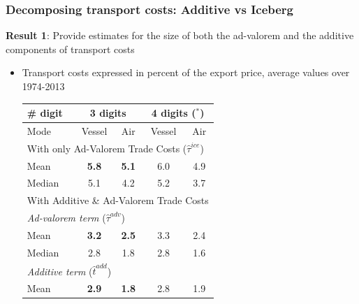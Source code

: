 \documentclass[10 pt,Helvetica, french]{beamer}
\begin{document}
\begin{frame}[label=slide_results_summary]
\frametitle{Decomposing transport costs: Additive vs Iceberg}
\textbf{Result 1}: Provide estimates for the size of both the ad-valorem and the additive components of transport costs
\begin{itemize}
\item Transport costs expressed in percent of the export price, average values over 1974-2013 \hyperlink{app_results_summary}{}  \vspace{0.1cm}
\begin{table}[htbp]
  \centering
  \scriptsize{
  \begin{center}
    \begin{tabular}{l|cc|cc}
      \hline \hline
    \# digit & \multicolumn{2}{c}{3 digits} & \multicolumn{2}{c}{4 digits ($^\ast$)} \\ \hline
    Mode  & Vessel & Air & Vessel & Air \\ \hline
    \multicolumn{5}{l}{With only Ad-Valorem Trade Costs ($\widehat{\tau}^{ice}$)}  \\ \hline
    Mean  & \bf{5.8} & \bf{5.1} & 6.0 & 4.9 \\
    Median & 5.1 & 4.2 & 5.2 & 3.7 \\ \hline
    \multicolumn{5}{l}{With Additive \& Ad-Valorem Trade Costs } \\ \hline
   \multicolumn{5}{l}{\textit{Ad-valorem term} ($\widehat{\tau}^{adv}$)}\\ \hline
    Mean  & \bf{3.2} & \bf{2.5} & 3.3 & 2.4 \\
    Median & 2.8 & 1.8 & 2.8 & 1.6 \\ \hline
    \multicolumn{5}{l}{\textit{Additive term }($\widehat{t}^{add}$)} \\ \hline
    Mean  & \bf{2.9} & \bf{1.8} & 2.8 & 1.9 \\

\end{tabular}
\end{center}}
\end{table}
\end{itemize}
\end{frame}
\end{document}
